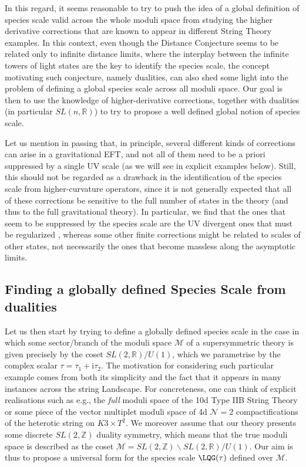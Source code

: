 In this regard, it seems reasonable to try to push the idea of a global definition of species scale valid across the whole moduli space from studying the higher derivative corrections that are known to appear in different String Theory examples. In this context, even though the Distance Conjecture seems to be related only to infinite distance limits, where the interplay between the infinite towers of light states are the key to identify the species scale, the concept motivating such conjecture, namely dualities, can also shed some light into the problem of defining a global species scale across all moduli space. Our goal is then to use the knowledge of higher-derivative corrections, together with dualities (in particular $SL(n, \mathbb{R})$) to try to propose a well defined global notion of species scale.

Let us mention in passing that, in principle, several different kinds of corrections can arise in a gravitational EFT, and not all of them need to be a priori suppressed by a single UV scale (as we will see in explicit examples below). Still, this should not be regarded as a drawback in the identification of the species scale from higher-curvature operators, since it is not generally expected that all of these corrections be sensitive to the full number of states in the theory (and thus to the full gravitational theory). In particular, we find that the ones that seem to be suppressed by the species scale are the UV divergent ones that must be regularized \cite{Green:1997as}, whereas some other finite corrections might be related to scales of other states, not necessarily the ones that become massless along the asymptotic limits.

\subsection{Finding a globally defined Species Scale from dualities}
\label{ss:modinvariantss}

Let us then start by trying to define a globally defined species scale in the case in which some sector/branch of the moduli space $\mathcal{M}$ of a supersymmetric theory is given precisely by the coset $SL(2, \mathbb{R})/U(1)$, which we parametrise by the complex scalar $\tau=\tau_1 + \text{i} \tau_2$. The motivation for considering such particular example comes from both its simplicity and the fact that it appears in many instances across the string Landscape. For concreteness, one can think of explicit realisations such as e.g., the \emph{full} moduli space of the 10d Type IIB String Theory or some piece of the vector multiplet moduli space of 4d $\mathcal{N}=2$ compactifications of the heterotic string on $K3\times T^2$. We moreover assume that our theory presents some discrete $SL(2, \mathbb{Z})$ duality symmetry, which means that the true moduli space is described as the coset $\mathcal{M}= SL(2, \mathbb{Z}) \backslash SL(2, \mathbb{R})/U(1)$. Our aim is thus to propose a universal form for the species scale $\LQG (\tau)$ defined over $\mathcal{M}$.

